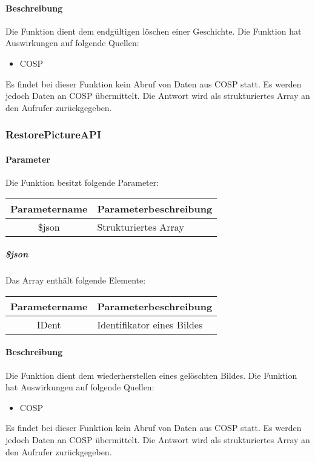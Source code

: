 \paragraph{Beschreibung} Die Funktion dient dem endgültigen löschen einer Geschichte. Die Funktion hat Auswirkungen auf folgende Quellen:
\begin{itemize}
	\item COSP
\end{itemize}
Es findet bei dieser Funktion kein Abruf von Daten aus {\glqq COSP\grqq} statt. Es werden jedoch Daten an {\glqq COSP\grqq} übermittelt. Die Antwort wird als strukturiertes Array an den Aufrufer zurückgegeben.
\subsubsection{RestorePictureAPI}
\paragraph{Parameter} Die Funktion besitzt folgende Parameter:
\begin{table}[H]
	\begin{tabular}{|c|p{11cm}|}
		\hline
		\textbf{Parametername} & \textbf{Parameterbeschreibung} \\ \hline
		\$json & Strukturiertes Array \\ \hline
	\end{tabular}
\end{table}
\subparagraph{\$json}Das Array enthält folgende Elemente:
\begin{table}[H]
	\begin{tabular}{|c|p{11cm}|}
		\hline
		\textbf{Parametername} & \textbf{Parameterbeschreibung} \\ \hline
		IDent & Identifikator eines Bildes \\ \hline
	\end{tabular}
\end{table}
\paragraph{Beschreibung} Die Funktion dient dem wiederherstellen eines gelöschten Bildes. Die Funktion hat Auswirkungen auf folgende Quellen:
\begin{itemize}
	\item COSP
\end{itemize}
Es findet bei dieser Funktion kein Abruf von Daten aus {\glqq COSP\grqq} statt. Es werden jedoch Daten an {\glqq COSP\grqq} übermittelt. Die Antwort wird als strukturiertes Array an den Aufrufer zurückgegeben.
